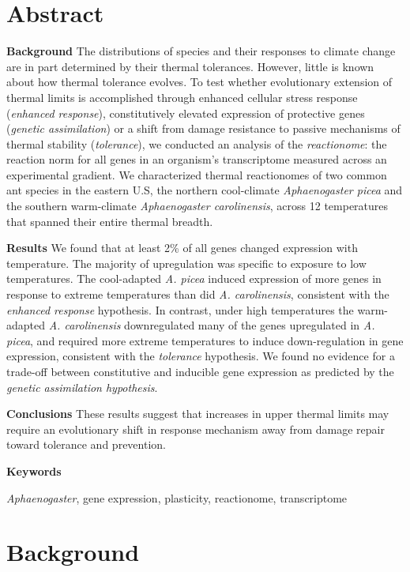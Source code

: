\documentclass[]{article}
\begin{document}
\newpage

\section{Abstract}\label{abstract}

\textbf{Background} The distributions of species and their responses to
climate change are in part determined by their thermal tolerances.
However, little is known about how thermal tolerance evolves. To test
whether evolutionary extension of thermal limits is accomplished through
enhanced cellular stress response (\emph{enhanced response}),
constitutively elevated expression of protective genes (\emph{genetic
assimilation}) or a shift from damage resistance to passive mechanisms
of thermal stability (\emph{tolerance}), we conducted an analysis of the
\emph{reactionome}: the reaction norm for all genes in an organism's
transcriptome measured across an experimental gradient. We characterized
thermal reactionomes of two common ant species in the eastern U.S, the
northern cool-climate \emph{Aphaenogaster picea} and the southern
warm-climate \emph{Aphaenogaster carolinensis}, across 12 temperatures
that spanned their entire thermal breadth.

\textbf{Results} We found that at least 2\% of all genes changed
expression with temperature. The majority of upregulation was specific
to exposure to low temperatures. The cool-adapted \emph{A. picea}
induced expression of more genes in response to extreme temperatures
than did \emph{A. carolinensis}, consistent with the \emph{enhanced
response} hypothesis. In contrast, under high temperatures the
warm-adapted \emph{A. carolinensis} downregulated many of the genes
upregulated in \emph{A. picea}, and required more extreme temperatures
to induce down-regulation in gene expression, consistent with the
\emph{tolerance} hypothesis. We found no evidence for a trade-off
between constitutive and inducible gene expression as predicted by the
\emph{genetic assimilation hypothesis}.

\textbf{Conclusions} These results suggest that increases in upper
thermal limits may require an evolutionary shift in response mechanism
away from damage repair toward tolerance and prevention.

\textbf{Keywords}

\emph{Aphaenogaster}, gene expression, plasticity, reactionome,
transcriptome

\section{Background}\label{background}
\end{document}
